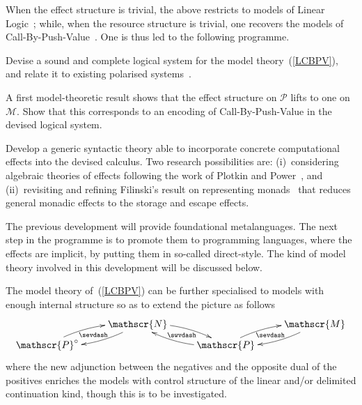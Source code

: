 \documentclass[11pt,twocolumn]{article}
\newcounter{CC}
\newenvironment{resenumerate}
  {\begin{list}{[\textbf{\arabic{CC}]}}
  {\usecounter{CC}
   \setlength{\topsep}{2pt}
   \setlength{\partopsep}{2pt}
   \setlength{\itemsep}{2.5pt}
   \setlength{\parsep}{2.5pt}
   \setlength{\leftmargin}{1.65em}
   \setlength{\labelwidth}{1.15em}
 }}
  {\end{list}}
\newcommand{\hide}[1]{}
\newcommand{\cat}[1]{\mathscr{#1}}
\newcommand{\op}{\circ}
\begin{document}
When the effect structure is trivial, the above restricts to models of Linear
Logic~\cite{MelliesCMLL}; while, when the resource structure is trivial, one
recovers the models of Call-By-Push-Value~\cite{LevyCBPV}.  One is thus led to
the following programme.
\begin{resenumerate}\setcounter{CC}{0}
\item\label{ItemOne}
  Devise a sound and complete logical system for the model
  theory~(\ref{LCBPV}), and relate it to existing polarised
  systems~\cite{Munch,CurienMunch}.
\item
  A first model-theoretic result shows that the effect structure on $\cat
  P$ lifts to one on $\cat M$.  Show that this corresponds to an encoding
  of Call-By-Push-Value in the devised logical system.
\item
  Develop a generic syntactic theory able to incorporate concrete
  computational effects into the devised calculus.  Two research possibilities
  are: (i)~considering algebraic theories of effects following the work of
  Plotkin and Power~\cite{PlotkinPowerAlgOpsAndGenEffs}, and
  (ii)~revisiting and refining Filinski's result on representing
  monads~\cite{Filinski} that reduces general monadic effects to the
  storage and escape effects.  
  \hide{Either of these approaches will necessarily
  have to overcome serious shortcomings.  For instance, on the one hand,
  there is as yet no general operational theory of algebraic effects; and,
  on the other, a logical system for storage is not yet in place.  These
  problems will be investigated.}
\item\label{ItemFour}
  The previous development will provide foundational metalanguages.  The
  next step in the programme is to promote them to programming languages,
  where the effects are implicit, by putting them in so-called
  direct-style.  The kind of model theory involved in this development
  will be discussed below.
\end{resenumerate}

The model theory of~(\ref{LCBPV}) can be further specialised to
models with enough internal structure so as to extend the picture as
follows
\begin{equation}\label{LEEC}
  \begin{minipage}{\columnwidth}
  \xymatrix@R=5pt{
    & \ar@/^.75em/[dl] \ar@{}[dl]|-\sevdash \cat N \ar@/^.75em/[dr] &
    \ar@{}[rd]|-{\sevdash} \ar@{}[dl]|-{\swvdash} & \ar@/^.75em/[dl] \cat
    M \\
    \ar@/^.75em/[ur] \cat P^\op & & \ar@/^.75em/[lu] \cat P \ar@/^.75em/[ur] & 
  }\end{minipage}
\end{equation}
where the new adjunction between the negatives and the opposite dual of
the positives enriches the models with control structure of the
linear %
and/or delimited continuation %
kind, though this is to be investigated.
\end{document}
